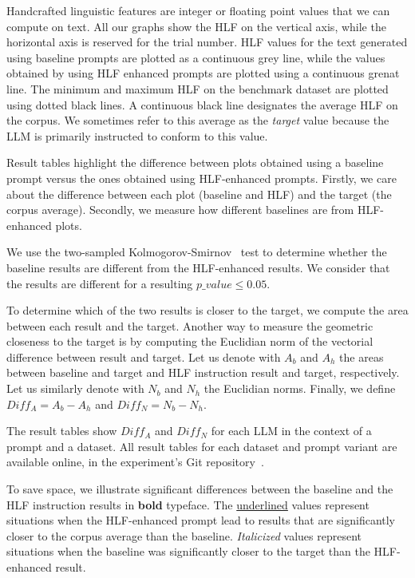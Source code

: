 \documentclass[runningheads,a4paper,11pt]{article}
\begin{document}
Handcrafted linguistic features are integer or floating point values that we
can compute on text.
All our graphs show the HLF on the vertical axis, while the horizontal axis is
reserved for the trial number.
HLF values for the text generated using baseline prompts are plotted as a
continuous grey line, while the values obtained by using HLF enhanced prompts
are plotted using a continuous grenat line.
The minimum and maximum HLF on the benchmark dataset are plotted using dotted
black lines.
A continuous black line designates the average HLF on the corpus.
We sometimes refer to this average as the \textit{target} value because the LLM
is primarily instructed to conform to this value.

Result tables highlight the difference between plots obtained using a
baseline prompt versus the ones obtained using HLF-enhanced prompts.
Firstly, we care about the difference between each plot (baseline and HLF) and
the target (the corpus average).
Secondly, we measure how different baselines are from HLF-enhanced plots.

We use the two-sampled Kolmogorov-Smirnov~\cite{kolmogorov1933,smirnov1939} test
to determine whether the baseline results are different from the HLF-enhanced
results.
We consider that the results are different for a resulting $p\_value \le 0.05$.

To determine which of the two results is closer to the target, we compute the
area between each result and the target.
Another way to measure the geometric closeness to the target is by computing the
Euclidian norm of the vectorial difference between result and target.
Let us denote with $A_b$ and $A_h$ the areas between baseline and target and HLF
instruction result and target, respectively.
Let us similarly denote with $N_b$ and $N_h$ the Euclidian norms.
Finally, we define $Diff_A = A_b - A_h$ and $Diff_N = N_b - N_h$.

The result tables show $Diff_A$ and $Diff_N$ for each LLM in the context of a
prompt and a dataset.
All result tables for each dataset and prompt variant are available online, in
the experiment's Git repository~\cite{olar2024experimentcode}.

To save space, we illustrate significant differences between the baseline and
the HLF instruction results in \textbf{bold} typeface.
The \underline{underlined} values represent situations when the HLF-enhanced
prompt lead to results that are significantly closer to the corpus average than
the baseline.
\textit{Italicized} values represent situations when the baseline was
significantly closer to the target than the HLF-enhanced result.
\end{document}
